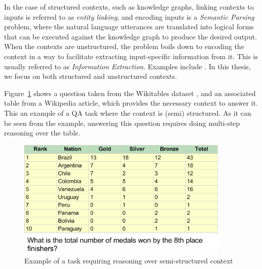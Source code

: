 In the case of structured contexts, such as knowledge graphs, linking contexts
to inputs is referred to as \emph{entity linking}, and encoding inputs is a \emph{Semantic Parsing} problem, where the natural language utterances are translated into
logical forms that can be executed against the knowledge graph to produce the desired output.
When the contexts are unstructured, the problem boils down to encoding the context in a way to facilitate extracting input-specific information from it. This is usually
referred to as \emph{Information Extraction}.
Examples include \cite{hill2015goldilocks,richardson2013mctest,penas2013qa4mre,breck2001looking}.
In this thesis, we focus on both structured and unstructured contexts.

Figure~\ref{fig:wikitables_example} shows a question taken from the Wikitables dataset \citep{pasupat2015compositional}, and an associated table from a Wikipedia article,
which provides the necessary context to answer it. This an example of a QA task where the context is (semi) structured. As it can be seen from the example, answering this
question requires doing multi-step reasoning over the table.
\begin{figure}
\begin{center}
\includegraphics[width=4in]{figures/wikitables_example.png}
\caption{Example of a task requiring reasoning over semi-structured context}
\label{fig:wikitables_example}
\end{center}
\end{figure}

